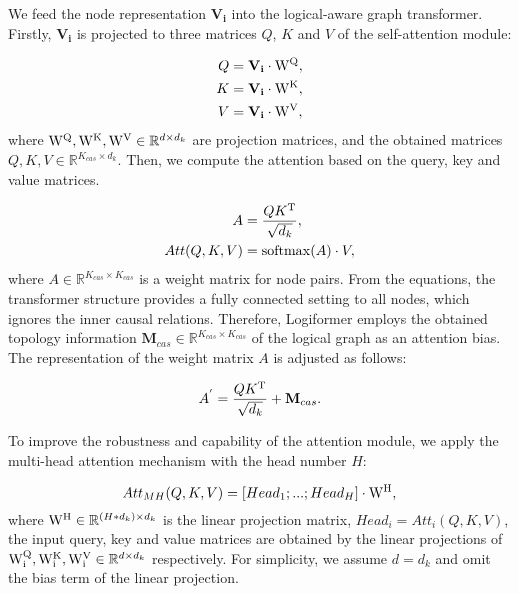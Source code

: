 \documentclass[sigconf]{acmart}
\begin{document}
We feed the node representation $\mathbf{V_{i}}$ into the logical-aware graph transformer. Firstly, $\mathbf{V_{i}}$ is projected to three matrices $Q$, $K$ and $V$ of the self-attention module:

\begin{equation}
	\begin{aligned}
		Q &= \mathbf{V_{i}} \cdot{\rm  W^{Q}},\\
		K &= \mathbf{V_{i}} \cdot {\rm W^{K}},\\
		V &= \mathbf{V_{i}} \cdot {\rm W^{V}},
	\end{aligned}
\end{equation}
where ${\rm W^{Q}, W^{K}, W^{V}} \in \mathbb{R}^{d \times d_{k}}$ are projection matrices, and the obtained matrices $Q, K, V \in \mathbb{R}^{K_{cas} \times d_{k}}$. Then, we compute the attention based on the query, key and value matrices.

\begin{equation}
	\begin{aligned}
		A &= \frac{Q K^{\rm T}}{\sqrt{d_{k}}}, \\
		Att(Q, K, V) &= {\rm softmax}(A) \cdot V,
	\end{aligned}
\end{equation}
where $A \in \mathbb{R}^{K_{cas}\times K_{cas}}$ is a weight matrix for node 
pairs. From the equations, the transformer structure provides a fully connected 
setting to all nodes, which ignores the inner causal relations. Therefore, 
Logiformer employs the obtained topology information $\mathbf{M}_{cas} \in 
\mathbb{R}^{K_{cas}\times K_{cas}}$ of the logical graph as an attention bias. 
The representation of the weight matrix $A$ is adjusted as follows:

\begin{equation}
	{A}^{'} = \frac{Q K^{\rm T}}{\sqrt{d_{k}}} + \mathbf{M}_{cas}.
\end{equation}

To improve the robustness and capability of the attention module, we apply the multi-head attention mechanism with the head number $H$:

\begin{equation}
	Att_{MH}(Q, K, V) = [Head_{1}; ...; Head_{H}] \cdot {\rm W^{H}},
\end{equation}
where ${\rm W^{H}}\in \mathbb{R}^{(H*d_{k}) \times d_{k}}$ is the linear projection matrix, $Head_{i}=Att_{i}(Q, K, V)$, the input query, key and value matrices are obtained by the linear projections of ${\rm W_{i}^{Q}, W_{i}^{K}, W_{i}^{V}} \in \mathbb{R}^{d \times d_{k}}$ respectively. For simplicity, we assume $d = d_{k}$ and omit the bias term of the linear projection.
\end{document}
